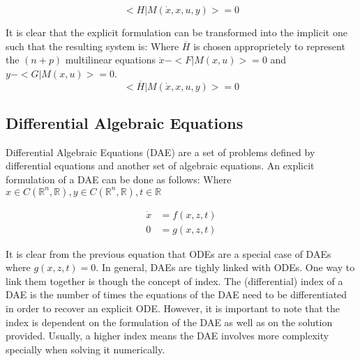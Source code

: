 \documentclass{article}
\begin{document}
\begin{equation}
    <H| M(\dot{x}, x, u, y)> = 0
\end{equation}

It is clear that the explicit formulation can be transformed into the implicit one such that the resulting system is:
Where $\overline{H}$ is chosen approprietely to represent the $(n+p)$ multilinear equations $\dot{x} - <F|M(x,u)> = 0$
and $y - <G|M(x,u)> = 0$.
\begin{equation}
    <\overline{H}| M(\dot{x}, x, u, y)> = 0
\end{equation}

\subsection{Differential Algebraic Equations}

Differential Algebraic Equations (DAE) are a set of problems defined by differential equations
and another set of algebraic equations. An explicit formulation of a DAE can be done as follows:
Where $x \in C(\mathbb{R}^n, \mathbb{R}), y \in C(\mathbb{R}^n, \mathbb{R}), t \in \mathbb{R}$

\begin{align}\label{DAE:explicit}
    \dot{x} &= f(x, z, t) \\
    0 &= g(x, z, t)
\end{align}

It is clear from the previous equation that ODEs are a special case of DAEs where $g(x,z,t) = 0$.
In general, DAEs are tighly linked with ODEs. One way to link them together is though the concept of index.
The (differential) index of a DAE is the number of times the equations  of the DAE
need to be differentiated in order to recover an explicit ODE. 
However, it is important to note that the index is dependent on the formulation of the DAE
as well as on the solution provided. Usually, a higher index means the DAE involves more complexity
specially when solving it numerically. \\
\end{document}
